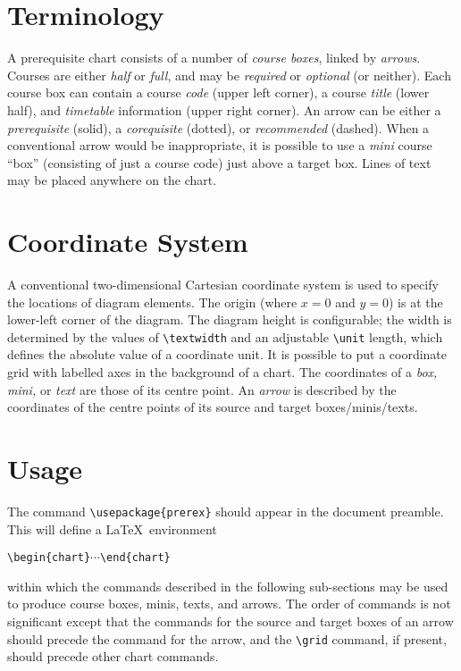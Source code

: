 \documentclass[11pt]{article}
\begin{document}
\section{Terminology}
A prerequisite chart consists of a number of 
\emph{course boxes},
linked by 
\emph{arrows}.
Courses are either
\emph{half}
or
\emph{full},
and may be 
\emph{required} or \emph{optional} (or neither).
Each course box can contain a course
\emph{code}
(upper left corner),
a course 
\emph{title}
(lower half),
and
\emph{timetable}
information
(upper right corner).
An arrow can be either a \emph{prerequisite} (solid),
a \emph{corequisite} (dotted),
or 
\emph{recommended} (dashed).
When a conventional arrow would be inappropriate, it is possible to use
a
\emph{mini} 
course ``box'' (consisting of just a course code) just above a target box.
Lines of text may be placed anywhere on the chart.
\section{Coordinate System}
A conventional two-dimensional
Cartesian coordinate system is used to specify the locations of
diagram elements.
The
origin (where
$x = 0$
and
$y = 0$)
is at the lower-left corner of the diagram.
The diagram height is configurable; the width is determined by
the values of
\verb|\textwidth|
and
an adjustable
\verb|\unit|
length, which defines the absolute value of a coordinate unit.
It is possible to put a coordinate grid with labelled axes
in the background of a chart.
The coordinates of a
\emph{box,}
\emph{mini,}
or
\emph{text}
are those of its centre point.  
An
\emph{arrow} 
is described by the
coordinates of the centre points of its source and target boxes/minis/texts. 



\section{Usage}
The command
\verb|\usepackage{prerex}|
should appear in the document preamble.
This will define a \LaTeX\ environment 
\begin{list}{}{}
\item \verb|\begin{chart}|\quad$\cdots$\quad \verb|\end{chart}|
\end{list}
within which the commands described in the following sub-sections may be used
to produce course boxes, minis, texts, and arrows. 
The order of commands is not significant except
that the commands for the source and target boxes of an arrow should 
precede
the command for the arrow, and the \verb|\grid| command, if present, should precede
other chart commands.
\end{document}
